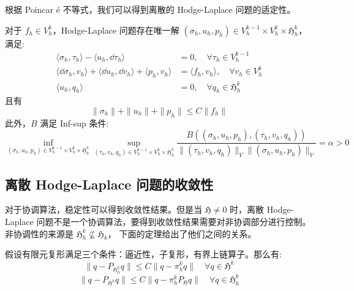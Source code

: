 \documentclass[lang=cn,a4paper,newtx]{elegantpaper}
\begin{document}
根据 Poincar \'e 不等式，我们可以得到离散的 Hodge-Laplace 问题的适定性。
\begin{theorem}
    对于 $f_h \in V_h^k$，Hodge-Laplace 问题存在唯一解 $(\sigma_h, u_h, p_h) \in
    V_h^{k-1}\times V_h^k \times \mathfrak{H}_h^k$，满足:
    \begin{align}
    \label{discrete0}
    \langle \sigma_h, \tau_h\rangle - \langle u_h, \dd \tau_h\rangle & = 0, \quad \forall \tau_h \in V_h^{k-1}\\
    \label{discrete1}
    \langle \dd \sigma_h, v_h\rangle + \langle \dd u_h, \dd v_h\rangle + \langle p_h, v_h\rangle & = \langle f_h, v_h\rangle, \quad \forall v_h \in V_h^k\\
    \label{discrete2}
    \langle u_h, q_h\rangle & = 0, \quad \forall q_h \in \mathfrak{H}_h^k
     \end{align}
    且有
    $$
    \|\sigma_h\| + \|u_h\| + \|p_h\| \leq C\|f_h\|
    $$
    此外，$B$ 满足 Inf-sup 条件:
    $$
    \inf_{(\sigma_h, u_h, p_h)\in V_h^{k-1}\times V_h^k \times \mathfrak{H}_h^k}
    \sup_{(\tau_h, v_h, q_h)\in V_h^{k-1}\times V_h^k \times \mathfrak{H}_h^k}
    \frac{B((\sigma_h, u_h, p_h), (\tau_h, v_h, q_h))}{\|(\tau_h, v_h,
    q_h)\|_V\|(\sigma_h, u_h, p_h)\|_V} = \alpha > 0
    $$
\end{theorem}
 
\subsection{离散 Hodge-Laplace 问题的收敛性}
对于协调算法，稳定性可以得到收敛性结果。但是当 $\mathfrak{H} \not=0$ 
时，离散 Hodge-Laplace
问题不是一个协调算法，要得到收敛性结果需要对非协调部分进行控制。
非协调性的来源是 $\mathfrak{H}^k_h \not\subseteq \mathfrak{H}_k$，
下面的定理给出了他们之间的关系。
\begin{theorem}
    假设有限元复形满足三个条件：逼近性，子复形，有界上链算子。那么有:
    $$
    \|q - P_{\mathfrak{H}_h^k} q\| \leq C\|q - \pi_h^k q\| \quad \forall q \in
    \mathfrak{H}^k
    $$
    $$
    \|q - P_{\mathfrak{H}^k} q\| \leq C\|q - \pi_h^k 
    P_{\mathfrak{H}}q\| \quad \forall q \in \mathfrak{H}_h^k
    $$
\end{theorem}
\end{document}
